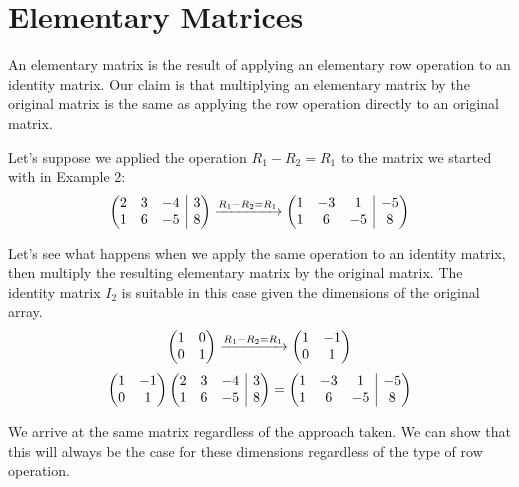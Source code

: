 \documentclass{article}
\begin{document}
\pagebreak
\section {Elementary Matrices}
\par \noindent An elementary matrix is the result of applying an elementary row operation to an identity matrix. Our claim is that multiplying an elementary matrix by the original matrix is the same as applying the row operation directly to an original matrix.
\newline
\par\noindent Let's suppose we applied the operation \( R_1 - R_2 = R_1 \) to the matrix we started with in Example 2:
\[
\left(\begin{array}{@{}ccc|c@{}}
	2 & 3 & -4 & 3 \\
	1 & 6 & -5 & 8
\end{array}\right)
 \xrightarrow[]{R_1 - R_2 = R_1}
\left(\begin{array}{@{}ccc|c@{}}
	1 & -3 & 1 & -5 \\
	1 & 6 & -5 & 8
\end{array}\right)
\]
\par\noindent Let's see what happens when we apply the same operation to an identity matrix, then multiply the resulting elementary matrix by the original matrix. The identity matrix \(I_2\) is suitable in this case given the dimensions of the original array.
\[
\left(\begin{array}{@{}cc@{}}
	1 & 0 \\
	0 & 1 
\end{array}\right)
 \xrightarrow[]{R_1 - R_2 = R_1}
 \left(\begin{array}{@{}cc@{}}
	1 & -1 \\
	0 & 1 
\end{array}\right)
\]
\newline
\[
\left(\begin{array}{@{}cc@{}}
	1 & -1 \\
	0 & 1 
\end{array}\right)
\left(\begin{array}{@{}ccc|c@{}}
	2 & 3 & -4 & 3 \\
	1 & 6 & -5 & 8
\end{array}\right) = 
\left(\begin{array}{@{}ccc|c@{}}
	1 &- 3 & 1 & -5 \\
	1 & 6 & -5 & 8
\end{array}\right)
\]
\par \noindent We arrive at the same matrix regardless of the approach taken. We can show that this will always be the case for these dimensions regardless of the type of row operation.
\end{document}
